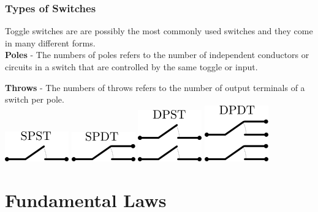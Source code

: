 \documentclass[fleqn]{beamer} %
\newcommand{\sectionIItitle}{Fundamental Laws}
\newcommand{\sectionIsubsectionIVtitle}{Types of Switches}
\begin{document}
			\begin{frame}
				\frametitle{\sectionIsubsectionIVtitle}
				
				\small

				Toggle switches are are possibly the most commonly used switches and they come in many different forms.\vspace{5mm}\\

				{\bf Poles } - The numbers of poles refers to the number of independent conductors or circuits in a switch that are controlled by the same toggle or input.
				
				{\bf Throws} - The numbers of throws refers to the number of output terminals of a switch per pole. \vspace{5mm}\\
				
				\includegraphics[scale=.7]{images/spst_symbol.png} \hspace{5mm} \includegraphics[scale=.7]{images/spdt_symbol.png} \hspace{5mm}
				\includegraphics[scale=.7]{images/dpst_symbol.png} \hspace{5mm} \includegraphics[scale=.7]{images/dpdt_symbol.png}

			\end{frame}

	
	\section{\sectionIItitle}\label{sectionII}
\end{document}
